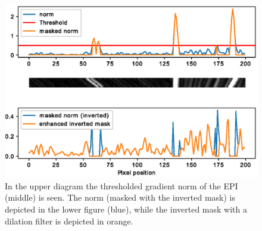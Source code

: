 \documentclass  [
  paper    = a4,
  BCOR     = 10mm,
  twoside,
  fontsize = 12pt,
  fleqn,
  toc      = bibnumbered,
  toc      = listofnumbered,
  numbers  = noendperiod,
  headings = normal,
  listof   = leveldown,
  version  = 3.03
]                                       {scrreprt}
\begin{document}
\begin{figure}
	\centering
	\includegraphics[width=1\linewidth]{images/segm_gaussian}
	\caption[Enhanced segmentation mask]{In the upper diagram the thresholded gradient norm of the EPI (middle) is seen. The norm (masked with the inverted mask) is depicted in the lower figure (blue), while the inverted mask with a dilation filter is depicted in orange.}
	\label{fig:segmgaussian}
\end{figure}


 
\end{document}
